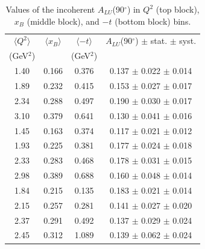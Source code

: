 \documentclass{article}
\begin{document}
\begin{table}[!h]
\begin{center}
\begin{tabular}{|c|c|c|c|}
\hline
 $\langle Q^{2} \rangle$ & $\langle x_{B} \rangle$ & $\langle -t \rangle$  & $A_{LU}$(90$^{\circ}$) $\pm$ stat. $\pm$ syst.\\
 (GeV$^{2}$) &           & (GeV$^{2}$) &  \\
 \hline 
  1.40  & 0.166 & 0.376 & 0.137  $\pm$ 0.022  $\pm$ 0.014 \\   
  1.89  & 0.232 & 0.415 & 0.153  $\pm$ 0.027  $\pm$ 0.017 \\   
  2.34  & 0.288 & 0.497 & 0.190  $\pm$ 0.030  $\pm$ 0.017 \\   
  3.10  & 0.379 & 0.641 & 0.130  $\pm$ 0.041  $\pm$ 0.016 \\   
 \hline 
  1.45  & 0.163 & 0.374 & 0.117  $\pm$ 0.021  $\pm$ 0.012 \\   
  1.93  & 0.225 & 0.381 & 0.177  $\pm$ 0.024  $\pm$ 0.018 \\   
  2.33  & 0.283 & 0.468 & 0.178  $\pm$ 0.031  $\pm$ 0.015 \\   
  2.98  & 0.389 & 0.688 & 0.160  $\pm$ 0.048  $\pm$ 0.014 \\   
 \hline 
  1.84  & 0.215 & 0.135 & 0.183  $\pm$ 0.021  $\pm$ 0.014 \\   
  2.15  & 0.257 & 0.281 & 0.141  $\pm$ 0.027  $\pm$ 0.020 \\   
  2.37  & 0.291 & 0.492 & 0.137  $\pm$ 0.029  $\pm$ 0.024 \\   
  2.45  & 0.312 & 1.089 & 0.139  $\pm$ 0.062  $\pm$ 0.024 \\   
 \hline
 \end{tabular}
 \caption{Values of the incoherent $A_{LU}$(90$^{\circ}$) in $Q^2$ (top block), $x_B$ (middle block), and $-t$ (bottom block) bins.}
 \label{table:InCoh_BSA_90}
 \end{center}
\end{table}
\end{document}
